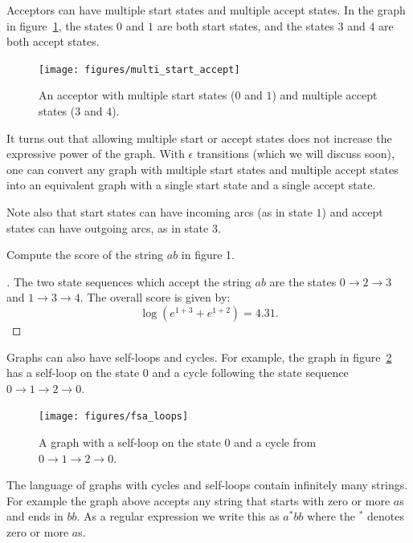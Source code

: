 \documentclass[main.tex]{subfiles}
\begin{document}
Acceptors can have multiple start states and multiple accept states. In the
graph in figure~\ref{fig:multi_start_accept}, the states $0$ and $1$ are both
start states, and the states $3$ and $4$ are both accept states.

\begin{figure}
    \centering
    \texttt{[image: figures/multi\_start\_accept]}
    \caption{An acceptor with multiple start states ($0$ and $1$) and multiple
    accept states ($3$ and $4$).}
    \label{fig:multi_start_accept}
\end{figure}

It turns out that allowing multiple start or accept states does not increase
the expressive power of the graph. With $\epsilon$ transitions (which we will
discuss soon), one can convert any graph with multiple start states and
multiple accept states into an equivalent graph with a single start state and a
single accept state.

Note also that start states can have incoming arcs (as in state $1$) and accept
states can have outgoing arcs, as in state $3$.

\begin{example}
Compute the score of the string $ab$ in figure 1.
\end{example}

\begin{proof}[\unskip\nopunct]
The two state sequences which accept the string $ab$ are the states $0
\rightarrow 2 \rightarrow 3$ and $1 \rightarrow 3 \rightarrow 4$. The overall
score is given by:
$$
\log (e^{1 + 3} + e^{1 + 2}) = 4.31.
$$
\end{proof}

Graphs can also have self-loops and cycles. For example, the graph in
figure~\ref{fig:fsa_loops} has a self-loop on the state $0$ and a cycle
following the state sequence $0 \rightarrow 1 \rightarrow 2 \rightarrow 0$.

\begin{figure}
    \centering
    \texttt{[image: figures/fsa\_loops]}
    \caption{A graph with a self-loop on the state $0$ and a cycle from $0
    \rightarrow 1 \rightarrow 2 \rightarrow 0$.}
    \label{fig:fsa_loops}
\end{figure}

The language of graphs with cycles and self-loops contain infinitely many
strings. For example the graph above accepts any string that starts with zero
or more $a$s and ends in $bb$. As a regular expression we write this as $a^*bb$
where the $^*$ denotes zero or more $a$s.
\end{document}
